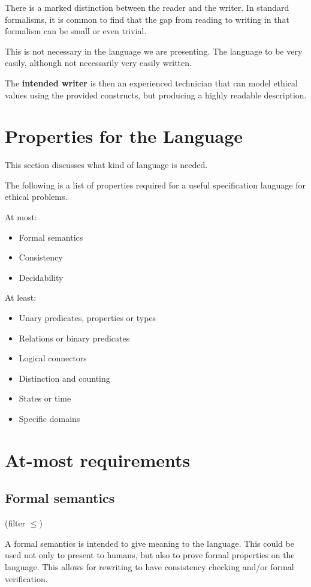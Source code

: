 There is a marked distinction between the reader and the writer.
In standard formalisms, it is common to find that the gap from reading to writing in that formalism can be small or even trivial.

This is not necessary in the language we are presenting.
The language to be very easily, although not necessarily very easily written.

The \textbf{intended writer} is then an experienced technician that can model ethical values using the provided constructs, but producing a highly readable description.


\section{Properties for the Language}

This section discusses what kind of language is needed.

The following is a list of properties required for a useful specification language for ethical problems.

At most:
\begin{itemize}
    \item Formal semantics
    \item Consistency
    \item Decidability
\end{itemize}

At least:
\begin{itemize}
    \item Unary predicates, properties or types
    \item Relations or binary predicates
    \item Logical connectors
    \item Distinction and counting
    \item States or time
    \item Specific domains
\end{itemize}


\section{At-most requirements}

\subsection{Formal semantics}

(filter $\leq $)

A formal semantics is intended to give meaning to the language.
This could be used not only to present to humans, but also to prove formal properties on the language.
This allows for rewriting to have consistency checking and/or formal verification.

